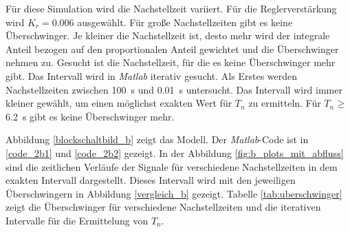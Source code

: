 Für diese Simulation wird die Nachstellzeit variiert. Für die Reglerverstärkung wird $K_r=0.006$ ausgewählt. Für große Nachstellzeiten gibt es keine Überschwinger. Je kleiner die Nachstellzeit ist, desto mehr wird der integrale Anteil bezogen auf den proportionalen Anteil gewichtet und die Überschwinger nehmen zu. Gesucht ist die Nachstellzeit, für die es keine Überschwinger mehr gibt. Das Intervall wird in \textit{Matlab} iterativ gesucht. Als Erstes werden Nachstellzeiten zwischen \SI{100}{s} und \SI{0.01}{s} untersucht. Das Intervall wird immer kleiner gewählt, um einen möglichst exakten Wert für $T_n$ zu ermitteln. Für $T_n \geq$ \SI{6.2}{s} gibt es keine Überschwinger mehr.

Abbildung \ref{blockschaltbild_b} zeigt das Modell. Der \textit{Matlab}-Code ist in \ref{code_2b1} und \ref{code_2b2} gezeigt. In der Abbildung \ref{fig:b_plots_mit_abfluss} sind die zeitlichen Verläufe der Signale für verschiedene Nachstellzeiten in dem exakten Intervall dargestellt. Dieses Intervall wird mit den jeweiligen Überschwingern in Abbildung \ref{vergleich_b} gezeigt. Tabelle \ref{tab:uberschwinger} zeigt die Überschwinger für verschiedene Nachstellzeiten und die iterativen Intervalle für die Ermittelung von $T_n$. 

